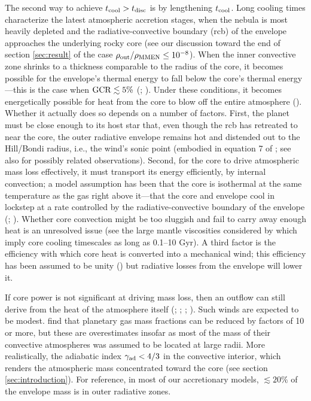 \documentclass[fleqn,useAMS,usenatbib]{mnras}
\begin{document}
The second way to achieve $t_{\rm cool} > t_{\rm disc}$
is by lengthening $t_{\rm cool}$. Long cooling times characterize
the latest atmospheric accretion stages,
when the nebula is most heavily depleted
and the radiative-convective boundary (rcb) of the envelope 
approaches the underlying rocky core 
(see our discussion toward the end 
of section \ref{sec:result} of the case 
$\rho_{\rm out}/\rho_{\rm MMEN} \leq 10^{-8}$).
When the inner convective zone shrinks to a thickness
comparable to the radius of the core,
it becomes possible for the envelope's thermal energy to fall below
the core's thermal energy---this is the case
when ${\rm GCR} \lesssim 5\%$ (\citealt{ginzburg16}; \citealt{ginzburg17}).
Under these conditions, it becomes energetically possible
for heat from the core to blow off the entire atmosphere (\citealt{ikoma12}). 
Whether it actually does so depends on a number of factors. First,
the planet must be close enough to its host star
that,
even though the rcb has retreated to near the core, 
the outer radiative envelope remains hot and distended out to the Hill/Bondi
radius, i.e., the wind's sonic point (embodied in equation 7 of \citealt{ginzburg17};
see also \citealt{fulton17} for possibly related observations).
Second, for the core to drive atmospheric mass loss effectively, it
must transport its energy
efficiently, by internal convection; a model assumption has been that the core
is isothermal at the same temperature as the gas right above it---that
the core and envelope cool in lockstep
at a rate controlled by the radiative-convective boundary of the
envelope (\citealt{ikoma12}; \citealt{ginzburg17}).  Whether core
convection might be too sluggish and fail to carry away enough heat
is an unresolved issue (see the large mantle viscosities considered by
\citealt{stamenkovic12} which imply core cooling timescales as long as
0.1--10 Gyr). A third factor is the efficiency with which 
core heat is converted into a mechanical wind; this efficiency has been
assumed to be unity (\citealt{ginzburg17}) but radiative losses from the
envelope will lower it.

If core power is not significant at driving mass loss, then
an outflow can still derive from the heat of the atmosphere itself
(\citealt{ikoma12}; \citealt{owen16}; \citealt{ginzburg16};
\citealt{ginzburg17}). Such winds are expected to be modest.
\citet{owen16} find that planetary gas mass fractions can be reduced 
by factors of 10 or more,
but these are overestimates insofar as most of the mass of their
convective atmospheres was assumed to be located at large radii.
More realistically, the adiabatic index $\gamma_{\rm ad} < 4/3$
in the convective interior,
which renders the atmospheric mass concentrated toward the core
(see section \ref{sec:introduction}). For reference, in most of our
accretionary models, $\lesssim 20\%$ of the envelope mass is in 
outer radiative zones.
\end{document}
